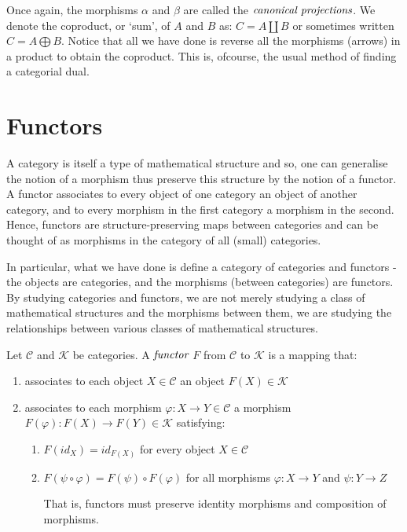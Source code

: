 \documentclass[10pt, oneside, reqno]{amsart}
\begin{document}
Once again, the morphisms $\alpha$ and $\beta$ are called the $\emph{canonical projections}$.
We denote the coproduct, or `sum', of $A$ and $B$ as: $C = A \coprod B$ or sometimes written $C = A \bigoplus B$.
Notice that all we have done is reverse all the morphisms (arrows) in a product to obtain the coproduct.
This is, ofcourse, the usual method of finding a categorial dual.


\section{Functors} %
\label{sec:functors}
A category is itself a type of mathematical structure and so, one can generalise the notion of a morphism thus preserve this structure by the notion of a
functor.
A functor associates to every object of one category an object of another category, and to every morphism in the first category a morphism in the second.
Hence, functors are structure-preserving maps between categories and can be thought of as morphisms in the category of all (small) categories.

In particular, what we have done is define a category of categories and functors - the objects are categories, and the morphisms (between categories) 
are functors.
By studying categories and functors, we are not merely studying a class of mathematical structures and the morphisms between them,
we are studying the relationships between various classes of mathematical structures.

\begin{defn}[Functor]
	Let $\mathcal{C}$ and $\mathcal{K}$ be categories. A $\emph{functor}$ $F$ from $\mathcal{C}$ to $\mathcal{K}$ is a mapping that:
	\begin{enumerate}
		\item associates to each object $X \in \mathcal{C}$ an object $F(X) \in  \mathcal{K}$
		
		\item associates to each morphism $\varphi: X \to Y \in \mathcal{C}$ a morphism $F(\varphi) : F(X) \to F(Y) \in \mathcal{K}$
		satisfying:
		\begin{enumerate}
			\item $F(id_{X}) = id_{F(X)}$ for every object $X \in \mathcal{C}$
			
			\item $F(\psi \circ \varphi) = F(\psi) \circ F(\varphi)$ for all morphisms $\varphi: X \to Y$ and $\psi: Y \to Z$
			\begin{rem}
				That is, functors must preserve identity morphisms and composition of morphisms.
			\end{rem}
		\end{enumerate}
	\end{enumerate}
\end{defn}
\end{document}
